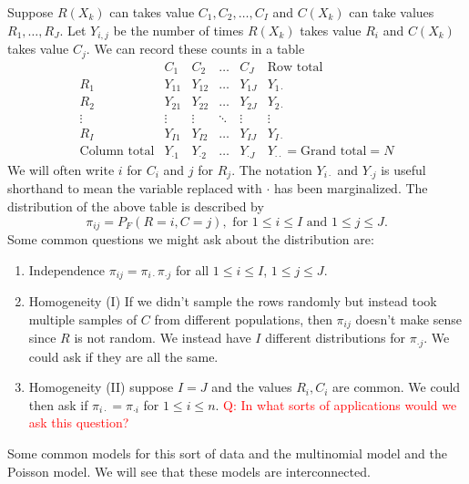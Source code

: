 Suppose $R(X_k)$ can takes value $C_1,C_2,\ldots,C_I$ and $C(X_k)$ can take values $R_1,\ldots,R_J$. Let $Y_{i,j}$ be the number of times $R(X_k)$ takes value $R_i$ and $C(X_k)$ takes value  $C_j$. We can record these counts in a table
\[\begin{array}{c|cccc|c}
    &C_1&C_2&\ldots&C_J&\text{Row total}\\
    \hline
R_1 &Y_{11}&Y_{12}&\ldots&Y_{1J}&Y_{1\cdot}\\
R_2&Y_{21}&Y_{22}&\ldots&Y_{2J}&Y_{2\cdot}\\
\vdots&\vdots&\vdots&\ddots&\vdots&\vdots \\
R_I&Y_{I1}&Y_{I2}&\ldots&Y_{IJ}&Y_{I\cdot}\\
\hline 
\text{Column total}& Y_{\cdot 1}&Y_{\cdot 2}&\ldots &Y_{\cdot J} & Y_{\cdot\cdot}=\text{Grand total}=N
\end{array} \]
We will often write $i$ for $C_i$ and $j$ for $R_j$. The notation $Y_{i\cdot}$ and $Y_{\cdot j}$ is useful shorthand to mean the variable replaced with $\cdot$ has been marginalized. The distribution of the above table is described by 
\[\pi_{ij} = P_F(R=i, C=j), \text{ for } 1 \le i \le I \text{ and } 1 \le j \le J. \]
Some common questions we might ask about the distribution are:
\begin{enumerate}
    \item Independence $\pi_{ij} = \pi_{i \cdot}\pi_{\cdot j}$ for all $1 \le i \le I$, $1 \le j \le J$.
    \item Homogeneity (I) If we didn't sample the rows randomly but instead took multiple samples of $C$ from different populations, then $\pi_{ij}$ doesn't make sense since $R$ is not random. We instead have $I$ different distributions for $\pi_{\cdot j}$. We could ask if they are all the same.
    \item Homogeneity (II) suppose $I=J$ and the values $R_i,C_i$ are common. We could then ask if $\pi_{i \cdot} = \pi_{\cdot i}$ for $1 \le i \le n$. \textcolor{red}{Q: In what sorts of applications would we ask this question?}
\end{enumerate}
Some common models for this sort of data and the multinomial model and the Poisson model. We will see that these models are interconnected.
